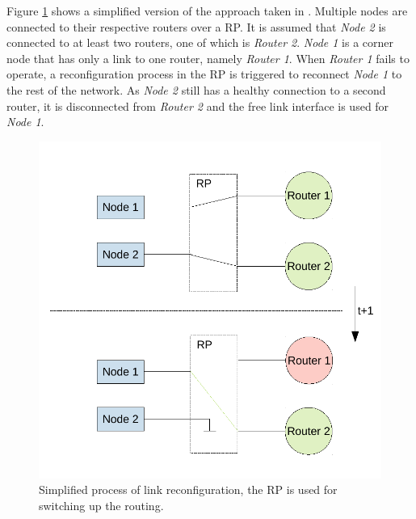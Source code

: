 Figure \ref{fig:nocSwap} shows a simplified version of the approach taken in \cite{wang_dynamic_2018}. 
Multiple nodes are connected to their respective routers over a \gls{RP}.
It is assumed that \textit{Node 2} is connected to at least two routers, one of which is \textit{Router 2}.
\textit{Node 1} is a corner node that has only a link to one router, namely \textit{Router 1}.
When \textit{Router 1} fails to operate, a reconfiguration process in the \gls{RP} is triggered to reconnect \textit{Node 1} to the rest of the network.
As \textit{Node 2} still has a healthy connection to a second router, it is disconnected from \textit{Router 2} and the free link interface is used for \textit{Node 1}.
\begin{figure}
    \centering
    \includegraphics[width=\columnwidth]{graphics/nocSwap.pdf}
    \caption{Simplified process of link reconfiguration, the \gls{RP} is used for switching up the routing.}\label{fig:nocSwap}
\end{figure}
